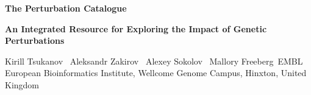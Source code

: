 \documentclass[20pt]{extarticle}
\begin{document}
\RaggedRight

{\fontsize{64}{69}\selectfont\bfseries The Perturbation Catalogue}\par
\vspace{1mm}
{\fontsize{43}{48}\selectfont\bfseries
An Integrated Resource for Exploring the Impact of Genetic Perturbations}\par

\vspace{5mm}
{\fontsize{23}{28}\selectfont
Kirill Tsukanov \textbullet\ Aleksandr Zakirov \textbullet\ Alexey Sokolov \textbullet\ Mallory Freeberg\
\color{Muted}EMBL European Bioinformatics Institute, Wellcome Genome Campus, Hinxton, United Kingdom}

\vspace{7mm}
\end{document}
